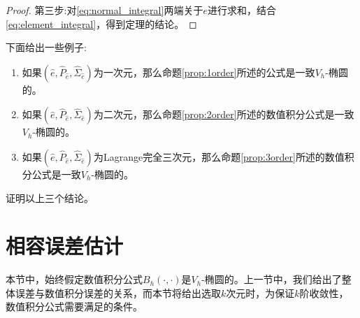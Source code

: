 \begin{proof}
    第三步:对\eqref{eq:normal_integral}两端关于$e$进行求和，结合\eqref{eq:element_integral}，得到定理的结论。
\end{proof}
下面给出一些例子:
\begin{enumerate}
    \item 如果$(\hat{e},\hat{P}_{\hat{e}},\hat{\Sigma}_{\hat{e}})$为一次元，那么命题\ref{prop:1order}所述的公式是一致$V_{h}$-椭圆的。
    \item 如果$(\hat{e},\hat{P}_{\hat{e}},\hat{\Sigma}_{\hat{e}})$为二次元，那么命题\ref{prop:2order}所述的数值积分公式是一致$V_{h}$-椭圆的。
   \item 如果$(\hat{e},\hat{P}_{\hat{e}},\hat{\Sigma}_{\hat{e}})$为Lagrange完全三次元，那么命题\ref{prop:3order}所述的数值积分公式是一致$V_{h}$-椭圆的。
\end{enumerate}
\begin{exercise}
    证明以上三个结论。
\end{exercise}
\section{相容误差估计}
本节中，始终假定数值积分公式$B_{h}(\cdot,\cdot)$是$V_{h}$-椭圆的。上一节中，我们给出了整体误差与数值积分误差的关系，而本节将给出选取$k$次元时，为保证$k$阶收敛性，数值积分公式需要满足的条件。

